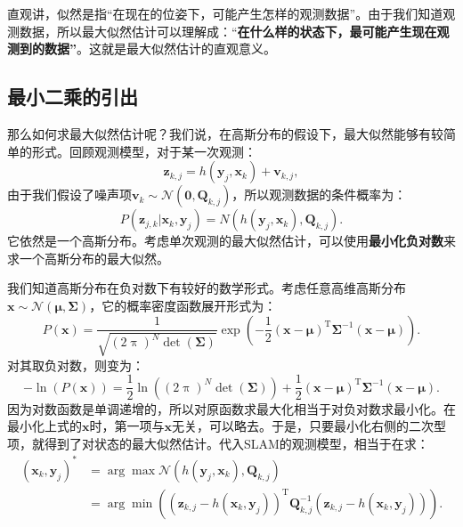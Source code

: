 直观讲，似然是指“在现在的位姿下，可能产生怎样的观测数据”。由于我们知道观测数据，所以最大似然估计可以理解成：“\textbf{在什么样的状态下，最可能产生现在观测到的数据”}。这就是最大似然估计的直观意义。

\subsection{最小二乘的引出}
那么如何求最大似然估计呢？我们说，在高斯分布的假设下，最大似然能够有较简单的形式。回顾观测模型，对于某一次观测：
\[
{\bm{z}_{k,j}} = h\left( {{ \bm{y}_j},{ \bm{x}_k}}  \right)+ \bm{v}_{k,j},
\]
由于我们假设了噪声项${\bm{v}_k} \sim \mathcal{N}\left( {\bm{0},{{{\bm{Q}}}_{k,j}}} \right)$，所以观测数据的条件概率为：
\[
P( \bm{z}_{j,k} | \bm{x}_k, \bm{y}_j ) = N\left( h(\bm{y}_j, \bm{x}_k), \bm{Q}_{k,j} \right).
\]
它依然是一个高斯分布。考虑单次观测的最大似然估计，可以使用\textbf{最小化负对数}来求一个高斯分布的最大似然。

我们知道高斯分布在负对数下有较好的数学形式。考虑任意高维高斯分布$\bm{x} \sim \mathcal{N}(\bm{\mu}, \bm{\Sigma})$，它的概率密度函数展开形式为：
\begin{equation}
P\left( \bm{x} \right) = \frac{1}{{\sqrt {{{(2\uppi )}^N}\det ( \bm{\Sigma} )} }}\exp \left( { - \frac{1}{2}{{\left( { \bm{x} - \bm{\mu} } \right)}^\mathrm{T}}{ \bm{\Sigma} ^{ - 1}}\left( { \bm{x} - \bm{\mu} } \right)} \right).
\end{equation}
对其取负对数，则变为：
\begin{equation}
- \ln \left( {P\left( \bm{x} \right)} \right) = \frac{1}{2}\ln \left( {{{\left( {2\uppi } \right)}^N}\det \left( \bm{\Sigma}  \right)} \right) + \frac{1}{2}{\left( { \bm{x} - \bm{\mu} } \right)^\mathrm{T}}{\bm{\Sigma} ^{ - 1}}\left( {\bm{x} - \bm{\mu} } \right).
\end{equation}
因为对数函数是单调递增的，所以对原函数求最大化相当于对负对数求最小化。在最小化上式的$\bm{x}$时，第一项与$\bm{x}$无关，可以略去。于是，只要最小化右侧的二次型项，就得到了对状态的最大似然估计。代入SLAM的观测模型，相当于在求：
\begin{equation}
\begin{aligned}
(\bm{x}_k,\bm{y}_j)^* &= \arg \max \mathcal{N}(h(\bm{y}_j, \bm{x}_k), \bm{Q}_{k,j}) \\ &=  \arg \min \left( {{{\left( {{ \bm{z}_{k,j}} - h\left( {{\bm{x}_k},{\bm{y}_j}} \right)} \right)}^\mathrm{T}} \bm{Q}_{k,j}^{ - 1}\left( {{\bm{z}_{k,j}} - h\left( {{\bm{x}_k},{\bm{y}_j}} \right)} \right)} \right).
\end{aligned}
\end{equation}


